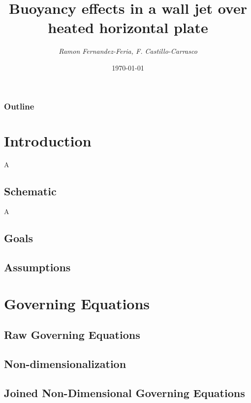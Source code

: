 \documentclass[compress]{beamer}
\title{Buoyancy effects in a wall jet over heated horizontal plate}
\author[Ramon Fernandez-Feria, F. Castillo-Carrasco]{\emph{Ramon Fernandez-Feria, F. Castillo-Carrasco} }
\date{\today}
\institute[Mathematics and Statistics]{
\texttt{[image: ASUlogo.pdf]} \\
{\color{ASUred} SCHOOL OF \textbf{MATHEMATICAL AND STATISTICAL SCIENCES}}}
\begin{document}
\begin{frame}[plain]
	\titlepage
\end{frame}

\begin{frame}
  \frametitle{Outline}
  \tableofcontents[pausesections]
\end{frame}

\section[Introduction]{Introduction}
A
\subsection{Schematic}
A
\subsection{Goals}
\subsection{Assumptions}
\section{Governing Equations}
\subsection{Raw Governing Equations}
\subsection{Non-dimensionalization}
\subsection{Joined Non-Dimensional Governing Equations}
\end{document}
